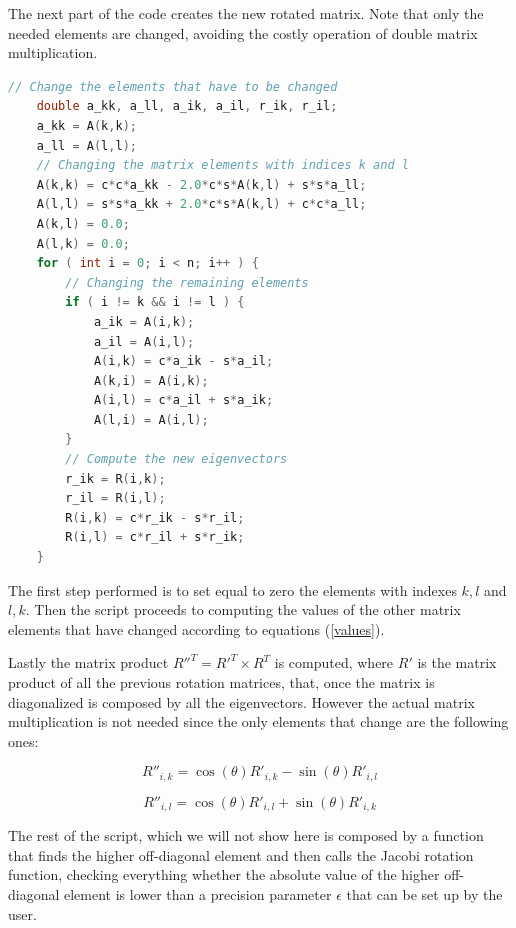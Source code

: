 \documentclass {article}
\begin{document}
The next part of the code creates the new rotated matrix. Note that only the needed elements are changed, avoiding the costly operation of double matrix multiplication.
\begin{lstlisting}[language=cpp]
    // Change the elements that have to be changed
    double a_kk, a_ll, a_ik, a_il, r_ik, r_il;
    a_kk = A(k,k);
    a_ll = A(l,l);
    // Changing the matrix elements with indices k and l
    A(k,k) = c*c*a_kk - 2.0*c*s*A(k,l) + s*s*a_ll;
    A(l,l) = s*s*a_kk + 2.0*c*s*A(k,l) + c*c*a_ll;
    A(k,l) = 0.0;
    A(l,k) = 0.0;
    for ( int i = 0; i < n; i++ ) {
        // Changing the remaining elements
        if ( i != k && i != l ) {
            a_ik = A(i,k);
            a_il = A(i,l);
            A(i,k) = c*a_ik - s*a_il;
            A(k,i) = A(i,k);
            A(i,l) = c*a_il + s*a_ik;
            A(l,i) = A(i,l);
        }
        // Compute the new eigenvectors
        r_ik = R(i,k);
        r_il = R(i,l);
        R(i,k) = c*r_ik - s*r_il;
        R(i,l) = c*r_il + s*r_ik;
    }
\end{lstlisting}

The first step performed is to set equal to zero the elements with indexes ${k, l}$ and ${l, k}$. Then the script proceeds to computing the values of the other matrix elements that have changed according to equations (\ref{values}).

Lastly the matrix product $R''^T=R'^T \times R^T$ is computed, where $R'$ is the matrix product of all the previous rotation matrices, that, once the matrix is diagonalized is composed by all the eigenvectors. However the actual matrix multiplication is not needed since the only elements that change are the following ones:

\begin{equation*}
R''_{i, k}=\cos(\theta) R'_{i, k}-\sin(\theta) R'_{i, l} 
\end{equation*}

\begin{equation*}
R''_{i, l}=\cos(\theta) R'_{i, l}+\sin(\theta) R'_{i, k} 
\end{equation*}

The rest of the script, which we will not show here is composed by a function that finds the higher off-diagonal element and then calls the Jacobi rotation function, checking everything whether the absolute value of the higher off-diagonal element is lower than a precision parameter $\epsilon$ that can be set up by the user.
\end{document}
